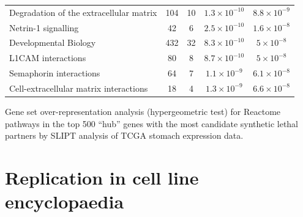 \begin{table}[!ht]
{\begin{threeparttable}
\begin{tabular}{lcccc}
  \rowcolor{black!10}
  Degradation of the extracellular matrix & 104 &  10 & $1.3 \times 10^{-10}$ & $8.8 \times 10^{-9}$ \\ 
  \rowcolor{black!5}
  Netrin-1 signalling &  42 &   6 & $2.5 \times 10^{-10}$ & $1.6 \times 10^{-8}$ \\ 
  \rowcolor{black!10}
  Developmental Biology & 432 &  32 & $8.3 \times 10^{-10}$ & $5 \times 10^{-8}$ \\ 
  \rowcolor{black!5}
  L1CAM interactions &  80 &   8 & $8.7 \times 10^{-10}$ & $5 \times 10^{-8}$ \\ 
  \rowcolor{black!10}
  Semaphorin interactions &  64 &   7 & $1.1 \times 10^{-9}$ & $6.1 \times 10^{-8}$ \\ 
  \rowcolor{black!5}
  Cell-extracellular matrix interactions &  18 &   4 & $1.3 \times 10^{-9}$ & $6.6 \times 10^{-8}$ \\ 
   \hline
\end{tabular}
\begin{tablenotes}
\raggedright \small
Gene set over-representation analysis (hypergeometric test) for Reactome pathways in the top 500 ``hub'' genes with the most candidate synthetic lethal partners by \gls{SLIPT} analysis of \gls{TCGA} stomach expression data.
\end{tablenotes}
\end{threeparttable}
}
\end{table}

\FloatBarrier

\iffalse
\chapter{Replication in cell line encyclopaedia} \label{appendix:CCLE}


